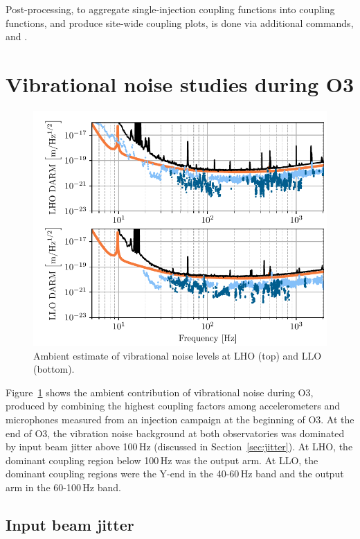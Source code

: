 Post-processing, to aggregate single-injection coupling functions into coupling functions, and produce site-wide coupling plots, is done via additional commands,  and .

\section{Vibrational noise studies during O3}

\begin{figure}[h!]
	\centering
	\includegraphics[width=\textwidth]{figures/ambient_vib.pdf}
	\caption{
		Ambient estimate of vibrational noise levels at LHO (top) and LLO (bottom).}
	\label{fig:ambient-vib}
\end{figure}

Figure~\ref{fig:ambient-vib} shows the ambient contribution of vibrational noise during \ac{O3}, produced by combining the highest coupling factors among accelerometers and microphones measured from an injection campaign at the beginning of \ac{O3}.
At the end of \ac{O3}, the vibration noise background at both observatories was dominated by input beam jitter above 100\,Hz (discussed in Section~\ref{sec:jitter}).
At \ac{LHO},  the dominant coupling region below 100\,Hz was the output arm.
At \ac{LLO}, the dominant coupling regions were the Y-end in the 40-60\,Hz band and the output arm in the 60-100\,Hz band.

\subsection{Input beam jitter}

